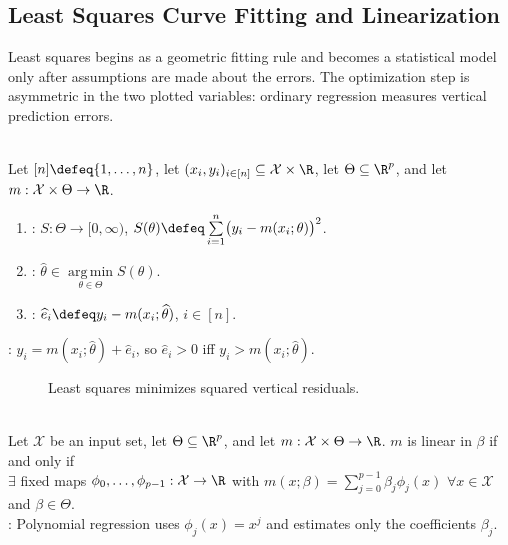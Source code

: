 \subsection{Least Squares Curve Fitting and Linearization}

Least squares begins as a geometric fitting rule and becomes a statistical model only after assumptions are made about the errors.  The optimization step is asymmetric in the two plotted variables: ordinary regression measures vertical prediction errors.

\begin{definition} \label{def:least-squares-parametric-fit} \\
Let $[n]\defeq\{1,\ldots,n\}$, let $(x_i,y_i)_{i\in[n]}\subseteq\mathcal{X}\times\R$, let $\Theta\subseteq\R^p$, and let $m:\mathcal{X}\times\Theta\to\R$.
\begin{enumerate}[label=(\roman*)]
\setlength{\itemsep}{0pt}
\item {}: $S:\Theta\to[0,\infty)$, $S(\theta)\defeq\sum\limits_{i=1}^{n}\bigl(y_i-m(x_i;\theta)\bigr)^2$.
\item {}: $\widehat{\theta}\in\operatorname*{arg\,min}\limits_{\theta\in\Theta}S(\theta)$.
\item {}: $\widehat{e}_i\defeq y_i-m(x_i;\widehat{\theta})$, $i\in[n]$.
\end{enumerate}
: $y_i=m(x_i;\widehat{\theta})+\widehat{e}_i$, so $\widehat{e}_i>0$ iff $y_i>m(x_i;\widehat{\theta})$.
\end{definition}

\begin{figure}[H]
  \centering
  
  \caption{Least squares minimizes squared \textcolor{red!70!black}{vertical residuals}.}
  \label{fig:regression-vertical-residuals}
\end{figure}

\begin{definition} \label{def:linear-in-the-parameters-model} \\
Let $\mathcal{X}$ be an input set, let $\Theta\subseteq\R^p$, and let $m:\mathcal{X}\times\Theta\to\R$.  $m$ is linear in $\beta$ if and only if\\
$\exists$ fixed maps $\phi_0,\ldots,\phi_{p-1}:\mathcal{X}\to\R$ with $m(x;\beta)=\sum\limits_{j=0}^{p-1}\beta_j\phi_j(x)$ $\forall x\in\mathcal{X}$ and $\beta\in\Theta$.\\
: Polynomial regression uses $\phi_j(x)=x^j$ and estimates only the coefficients $\beta_j$.
\end{definition}

